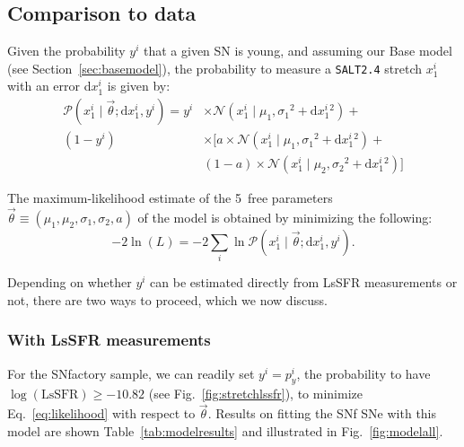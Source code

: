 \documentclass[]{aa}
\newcommand{\prob}[2]{\mathcal{P}\left( #1 \mid #2\right)}
\begin{document}
\subsection{Comparison to data}\label{sec:basemodelapplied}

Given the probability $y^i$ that a given SN is young, and assuming our Base
model (see Section~\ref{sec:basemodel}), the probability to measure a
\textsc{\texttt{SALT2.4}} stretch $x_1^i$ with an error d$x_1^i$ is given by:
\begin{align}\label{eq:likelihoodsnf}
    \prob{x^i_1}{\vec{\theta}; \mathrm{d}x^i_1, y^i} =
    y^i & \times
    \mathcal{N}\left(x^i_1 \mid \mu_1, \sigma_1{}^2+\mathrm{d}x^i_1{}^2\right) +
    \nonumber\\
    (1-y^i) &\times \bigg[
    a \times \mathcal{N}\left(x^i_1 \mid \mu_1,
    \sigma_1{}^2+\mathrm{d}x^i_1{}^2\right) +
    \nonumber\\
    & (1-a) \times \mathcal{N}\left(x^i_1 \mid \mu_2,
    \sigma_2{}^{2}+\mathrm{d}x^i_1{}^2\right) \bigg]
\end{align}

The maximum-likelihood estimate of the 5~free parameters
$\vec{\theta}\equiv({\mu_1,\mu_2,\sigma_1,\sigma_2,a})$ of the model is obtained
by minimizing the following:
\begin{equation}\label{eq:likelihood}
    -2\ln(L) = -2 \sum_i \ln \prob{x_1^i}{\vec{\theta};
    \mathrm{d}x_1^i, y^i}.
\end{equation}

Depending on whether $y^i$ can be estimated directly from LsSFR measurements or
not, there are two ways to proceed, which we now discuss.

\subsubsection{With LsSFR measurements}\label{sec:modelpy}

For the SNfactory sample, we can readily set $y^i = p^i_y$, the probability to
have $\log(\textrm{LsSFR}) \geq -10.82$ (see Fig.~\ref{fig:stretchlssfr}), to
minimize Eq.~\ref{eq:likelihood} with respect to $\vec{\theta}$. Results on
fitting the SNf SNe with this model are shown Table~\ref{tab:modelresults} and
illustrated in Fig.~\ref{fig:modelall}.
\end{document}
